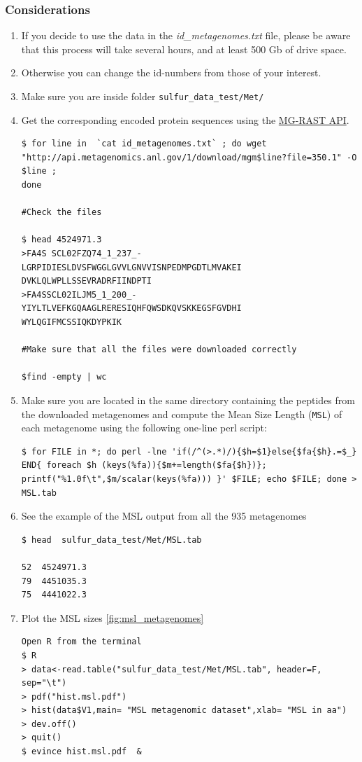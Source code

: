 \documentclass[12pt]{report}
\begin{document}
\subsubsection{Considerations}
\begin{enumerate}
\item If you decide to use the data in the  \textit{id\_metagenomes.txt} file, please be aware that this process will take several hours, and at least 500 Gb of drive space. 
\item Otherwise you can change the id-numbers from those of your interest.  
\item Make sure you are inside folder \verb+sulfur_data_test/Met/+

\item Get the corresponding encoded protein sequences using the  \href{http://api.metagenomics.anl.gov/api.html}{MG-RAST API}. 
\begin{verbatim}
$ for line in  `cat id_metagenomes.txt` ; do wget
"http://api.metagenomics.anl.gov/1/download/mgm$line?file=350.1" -O $line ;
done

#Check the files 

$ head 4524971.3
>FA4S SCL02FZQ74_1_237_-
LGRPIDIESLDVSFWGGLGVVLGNVVISNPEDMPGDTLMVAKEI
DVKLQLWPLLSSEVRADRFIINDPTI
>FA4SSCL02ILJM5_1_200_-
YIYLTLVEFKGQAAGLRERESIQHFQWSDKQVSKKEGSFGVDHI
WYLQGIFMCSSIQKDYPKIK

#Make sure that all the files were downloaded correctly 

$find -empty | wc
\end{verbatim}
\item  Make sure you are located in the same directory containing the peptides from the downloaded metagenomes and compute the Mean Size Length (\texttt{MSL}) of each metagenome  using the following one-line perl script:

\label{msl}
\begin{verbatim}
$ for FILE in *; do perl -lne 'if(/^(>.*)/){$h=$1}else{$fa{$h}.=$_} 
END{ foreach $h (keys(%fa)){$m+=length($fa{$h})}; 
printf("%1.0f\t",$m/scalar(keys(%fa))) }' $FILE; echo $FILE; done > 
MSL.tab
\end{verbatim}
\item See the example of the MSL output from all the 935 metagenomes 

\begin{verbatim}
$ head  sulfur_data_test/Met/MSL.tab 

52	4524971.3
79	4451035.3
75	4441022.3
\end{verbatim}
\item Plot the MSL sizes \ref{fig:msl_metagenomes}
\begin{verbatim}
Open R from the terminal 
$ R 
> data<-read.table("sulfur_data_test/Met/MSL.tab", header=F, sep="\t")
> pdf("hist.msl.pdf")
> hist(data$V1,main= "MSL metagenomic dataset",xlab= "MSL in aa")
> dev.off()
> quit()
$ evince hist.msl.pdf  & 
\end{verbatim}
\end{enumerate}
\end{document}
